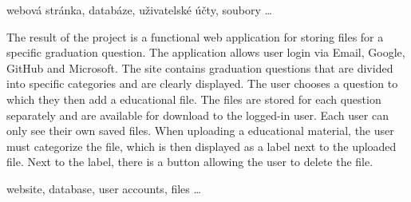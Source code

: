 \documentclass[12pt, a4paper,
oneside,      %
openright
]{report}
\begin{document}
	
	\noindent webová stránka, databáze, uživatelské účty, soubory \dots 
	
	\vspace{20pt}
	
	
	The result of the project is a functional web application for storing files for a specific graduation question. The application allows user login via Email, Google, GitHub and Microsoft. The site contains graduation questions that are divided into specific categories and are clearly displayed. The user chooses a question to which they then add a educational file. The files are stored for each question separately and are available for download to the logged-in user. Each user can only see their own saved files. When uploading a educational material, the user must categorize the file, which is then displayed as a label next to the uploaded file. Next to the label, there is a button allowing the user to delete the file.
	\\
	
	\vspace{18pt}
	
	
	\noindent website, database, user accounts, files \dots
	
	\vspace{18pt}
	
	\clearpage %

	
	\tableofcontents %

	\setcounter{page}{1} %

\end{document}
